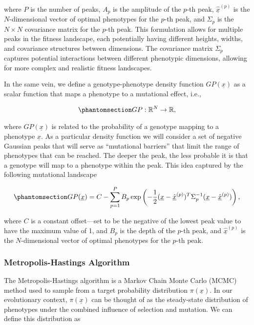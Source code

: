 \documentclass[
]{scrartcl}
\begin{document}
\begin{refsection}
where \(P\) is the number of peaks, \(A_p\) is the amplitude of the
\(p\)-th peak, \(\underline{\hat{x}}^{(p)}\) is the \(N\)-dimensional
vector of optimal phenotypes for the \(p\)-th peak, and \(\Sigma_p\) is
the \(N \times N\) covariance matrix for the \(p\)-th peak. This
formulation allows for multiple peaks in the fitness landscape, each
potentially having different heights, widths, and covariance structures
between dimensions. The covariance matrix \(\Sigma_p\) captures
potential interactions between different phenotypic dimensions, allowing
for more complex and realistic fitness landscapes.

In the same vein, we define a genotype-phenotype density function
\(GP(\underline{x})\) as a scalar function that maps a phenotype to a
mutational effect, i.e.,

\begin{equation}\phantomsection\label{eq-genotype-phenotype-density}{
GP: \mathbb{R}^N \to \mathbb{R},
}\end{equation}

where \(GP(\underline{x})\) is related to the probability of a genotype
mapping to a phenotype \(\underline{x}\). As a particular density
function we will consider a set of negative Gaussian peaks that will
serve as ``mutational barriers'' that limit the range of phenotypes that
can be reached. The deeper the peak, the less probable it is that a
genotype will map to a phenotype within the peak. This idea captured by
the following mutational landscape

\begin{equation}\phantomsection\label{eq-genotype-phenotype-density-peaks}{
GP(\underline{x}) = C -
\sum_{p=1}^P B_p
\exp\left(
    -\frac{1}{2}
    (\underline{x} - \underline{\hat{x}}^{(p)})^T 
    \Sigma_p^{-1} 
    (\underline{x} - \underline{\hat{x}}^{(p)})
\right),
}\end{equation}

where \(C\) is a constant offset---set to be the negative of the lowest
peak value to have the maximum value of 1, and \(B_p\) is the depth of
the \(p\)-th peak, and \(\underline{\hat{x}}^{(p)}\) is the
\(N\)-dimensional vector of optimal phenotypes for the \(p\)-th peak.

\subsubsection{Metropolis-Hastings
Algorithm}\label{metropolis-hastings-algorithm}

The Metropolis-Hastings algorithm is a Markov Chain Monte Carlo (MCMC)
method used to sample from a target probability distribution
\(\pi(\underline{x})\). In our evolutionary context,
\(\pi(\underline{x})\) can be thought of as the steady-state
distribution of phenotypes under the combined influence of selection and
mutation. \textcolor{tempcolor}{ We
can define this distribution as }


\end{refsection}
\end{document}
